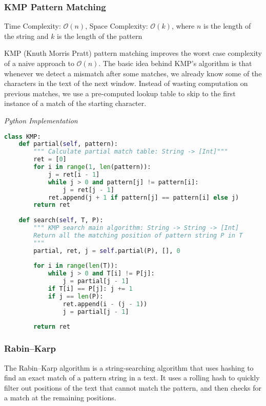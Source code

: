 \documentclass{article}
\newcommand{\bigO}{\mathcal{O}}
\begin{document}
    \subsubsection{KMP Pattern Matching}
    Time Complexity: $\bigO(n)$, Space Complexity: $\bigO(k)$, where $n$ is the length of the string and $k$ is the length of the pattern
    
    KMP (Knuth Morris Pratt) pattern matching improves the worst case complexity of a naive approach to $\bigO(n)$. The basic idea behind KMP’s algorithm is that whenever we detect a mismatch after some matches, we already know some of the characters in the text of the next window. Instead of wasting computation on previous matches, we use a pre-computed lookup table to skip to the first instance of a match of the starting character.
    
\vspace{8pt} \emph{Python Implementation}
\begin{lstlisting}[language=Python]    
class KMP:
    def partial(self, pattern):
        """ Calculate partial match table: String -> [Int]"""
        ret = [0]
        for i in range(1, len(pattern)):
            j = ret[i - 1]
            while j > 0 and pattern[j] != pattern[i]:
                j = ret[j - 1]
            ret.append(j + 1 if pattern[j] == pattern[i] else j)
        return ret
        
    def search(self, T, P):
        """ KMP search main algorithm: String -> String -> [Int] 
        Return all the matching position of pattern string P in T
        """
        partial, ret, j = self.partial(P), [], 0
        
        for i in range(len(T)):
            while j > 0 and T[i] != P[j]:
                j = partial[j - 1]
            if T[i] == P[j]: j += 1
            if j == len(P): 
                ret.append(i - (j - 1))
                j = partial[j - 1]
            
        return ret
\end{lstlisting}
    
    \subsubsection{Rabin–Karp}
    The Rabin–Karp algorithm is a string-searching algorithm that uses hashing to find an exact match of a pattern string in a text. It uses a rolling hash to quickly filter out positions of the text that cannot match the pattern, and then checks for a match at the remaining positions.
\end{document}
